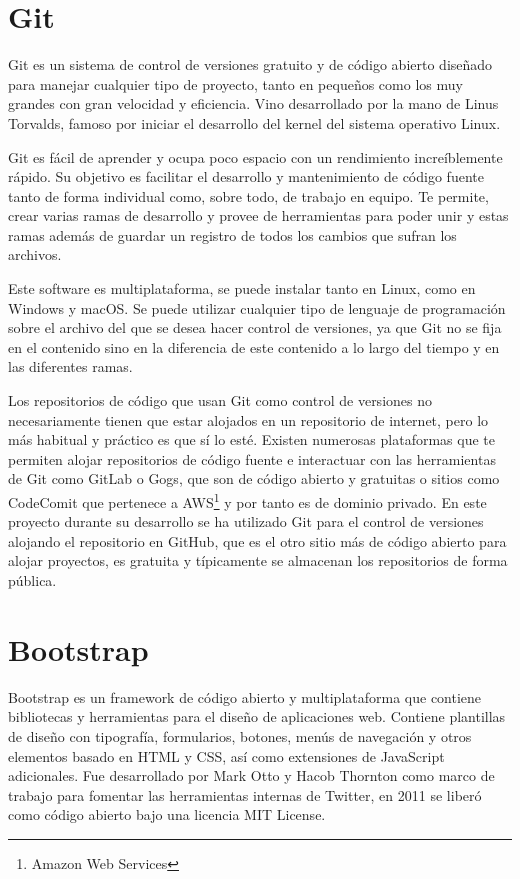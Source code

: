 \documentclass[a4paper, 12pt]{book}
\begin{document}
\section{Git} 
Git es un sistema de control de versiones gratuito y de código abierto diseñado para manejar cualquier tipo de proyecto, tanto en pequeños como los muy grandes con gran velocidad y eficiencia. Vino desarrollado por la mano de Linus Torvalds, famoso por iniciar el desarrollo del kernel del sistema operativo Linux. 

Git es fácil de aprender y ocupa poco espacio con un rendimiento increíblemente rápido. Su objetivo es facilitar el desarrollo y mantenimiento de código fuente tanto de forma individual como, sobre todo, de trabajo en equipo. Te permite, crear varias ramas de desarrollo y provee de herramientas para poder unir y estas ramas además de guardar un registro de todos los cambios que sufran los archivos. 

Este software es multiplataforma, se puede instalar tanto en Linux, como en Windows y macOS. Se puede utilizar cualquier tipo de lenguaje de programación sobre el archivo del que se desea hacer control de versiones, ya que Git no se fija en el contenido sino en la diferencia de este contenido a lo largo del tiempo y en las diferentes ramas. 

Los repositorios de código que usan Git como control de versiones no necesariamente tienen que estar alojados en un repositorio de internet, pero lo más habitual y práctico es que sí lo esté. Existen numerosas plataformas que te permiten alojar repositorios de código fuente e interactuar con las herramientas de Git como GitLab o Gogs, que son de código abierto y gratuitas o sitios como CodeComit que pertenece a AWS\footnote{Amazon Web Services} y por tanto es de dominio privado. En este proyecto durante su desarrollo se ha utilizado Git para el control de versiones alojando el repositorio en GitHub, que es el otro sitio más de código abierto para alojar proyectos, es gratuita y típicamente se almacenan los repositorios de forma pública.

\section{Bootstrap}
Bootstrap es un framework de código abierto y multiplataforma que contiene bibliotecas y herramientas para el diseño de aplicaciones web. Contiene plantillas de diseño con tipografía, formularios, botones, menús de navegación y otros elementos basado en HTML y CSS, así como extensiones de JavaScript adicionales. Fue desarrollado por Mark Otto y Hacob Thornton como marco de trabajo para fomentar las herramientas internas de Twitter, en 2011 se liberó como código abierto bajo una licencia MIT License.
\end{document}
